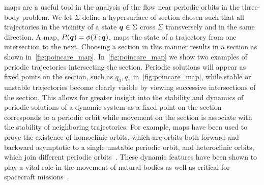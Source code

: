 \documentclass[smallcondensed]{svjour3}
\begin{document}
\Poincare maps are a useful tool in the analysis of the flow near periodic orbits in the three-body problem.
We let \( \Sigma \) define a hypersurface of section chosen such that all trajectories in the vicinity of a state \( \bm{q} \in \Sigma \) cross \( \Sigma \) transversely and in the same direction.
A \Poincare map, \( P(\bm{q}) = \phi(T;\bm{q}) \), maps the state of a trajectory from one intersection to the next.
Choosing a section in this manner results in a \Poincare section as shown in~\cref{fig:poincare_map}.
In~\cref{fig:poincare_map} we show two examples of periodic trajectories intersecting the \Poincare section. 
Periodic solutions will appear as fixed points on the section, such as \( q_0, q_1 \) in~\cref{fig:poincare_map}, while stable or unstable trajectories become clearly visible by viewing successive intersections of the section.
This allows for greater insight into the stability and dynamics of periodic solutions of a dynamic system as a fixed point on the \Poincare section corresponds to a periodic orbit while movement on the section is associate with the stability of neighboring trajectories. 
For example, \Poincare maps have been used to prove the existence of homoclinic orbits, which are orbits both forward and backward asymptotic to a single unstable periodic orbit, and heteroclinic orbits, which join different periodic orbits~\cite{conley1968,koon2000b}.
These dynamic features have been shown to play a vital role in the movement of natural bodies as well as critical for spacecraft missions~\cite{gomez2001,lo1997}.
\end{document}
